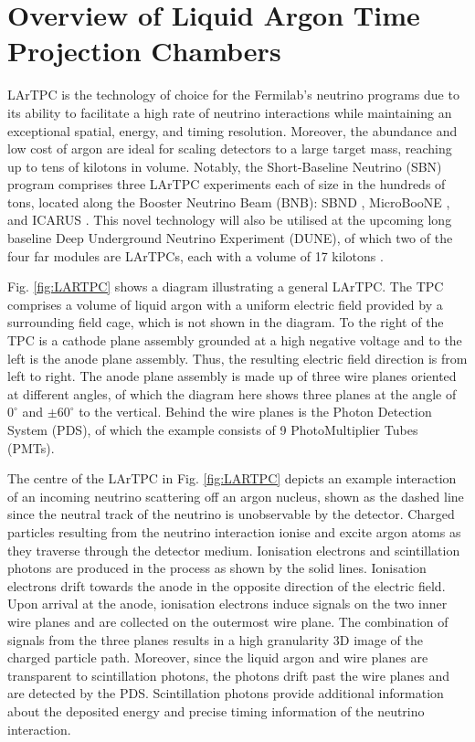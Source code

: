 \section{Overview of Liquid Argon Time Projection Chambers}
\label{sec3:overview}
LArTPC is the technology of choice for the Fermilab's neutrino programs due to its ability to facilitate a high rate of neutrino interactions while maintaining an exceptional spatial, energy, and timing resolution. 
Moreover, the abundance and low cost of argon are ideal for scaling detectors to a large target mass, reaching up to tens of kilotons in volume.
Notably, the Short-Baseline Neutrino (SBN) program \cite{SBNProgram} comprises three LArTPC experiments each of size in the hundreds of tons, located along the Booster Neutrino Beam (BNB): SBND \cite{sbnd_det}, MicroBooNE \cite{ubooneDet}, and ICARUS \cite{icarus_det}.
This novel technology will also be utilised at the upcoming long baseline Deep Underground Neutrino Experiment (DUNE), of which two of the four far modules are LArTPCs, each with a volume of 17 kilotons \cite{dunefd_det}.

Fig. \ref{fig:LARTPC} shows a diagram illustrating a general LArTPC.
The TPC comprises a volume of liquid argon with a uniform electric field provided by a surrounding field cage, which is not shown in the diagram.
To the right of the TPC is a cathode plane assembly grounded at a high negative voltage and to the left is the anode plane assembly.
Thus, the resulting electric field direction is from left to right.
The anode plane assembly is made up of three wire planes oriented at different angles, of which the diagram here shows three planes at the angle of $0^{\circ}$ and $\pm60^{\circ}$ to the vertical.
Behind the wire planes is the Photon Detection System (PDS), of which the example consists of 9 PhotoMultiplier Tubes (PMTs).   

The centre of the LArTPC in Fig. \ref{fig:LARTPC} depicts an example interaction of an incoming neutrino scattering off an argon nucleus, shown as the dashed line since the neutral track of the neutrino is unobservable by the detector.
Charged particles resulting from the neutrino interaction ionise and excite argon atoms as they traverse through the detector medium.
Ionisation electrons and scintillation photons are produced in the process as shown by the solid lines.
Ionisation electrons drift towards the anode in the opposite direction of the electric field.
Upon arrival at the anode, ionisation electrons induce signals on the two inner wire planes and are collected on the outermost wire plane.
The combination of signals from the three planes results in a high granularity 3D image of the charged particle path.
Moreover, since the liquid argon and wire planes are transparent to scintillation photons, the photons drift past the wire planes and are detected by the PDS.
Scintillation photons provide additional information about the deposited energy and precise timing information of the neutrino interaction.

